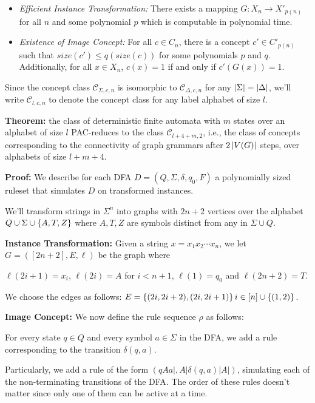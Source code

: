 \documentclass[]{article}
\providecommand{\tightlist}{%
  \setlength{\itemsep}{0pt}\setlength{\parskip}{0pt}}
\def\Concepts{\mathcal{C}\xspace}
\begin{document}
\begin{itemize}
\tightlist
\item
  \emph{Efficient Instance Transformation:} There exists a mapping
  \(G: X_n \to X'_{p(n)}\) for all \(n\) and some polynomial \(p\) which
  is computable in polynomial time.
\item
  \emph{Existence of Image Concept:} For all \(c \in C_n\), there is a
  concept \(c' \in C'_{p(n)}\) such that \(size(c') \leq q(size(c))\)
  for some polynomials \(p\) and \(q\). Additionally, for all
  \(x \in X_n\), \(c(x) = 1\) if and only if \(c'(G(x)) = 1\).
\end{itemize}

Since the concept class $\Concepts_{\Sigma,c,n}$ is isomorphic to $\Concepts_{\Delta,c,n}$ for any $\left| \Sigma \right| = \left| \Delta \right|$, we'll write $\Concepts_{l,c,n}$ to denote the concept class for any label alphabet of size $l$. 

\textbf{Theorem:} the class of deterministic finite automata with $m$ states
over an alphabet of size $l$ PAC-reduces to the class $\Concepts_{l+4+m,2}$,
i.e., the class of concepts corresponding to the connectivity of graph grammars
after $2\left| V(G) \right|$ steps, over alphabets of size $l+m+4$.

\textbf{Proof:}
We describe for each DFA $D=(Q,\Sigma,\delta,q_0,F)$ a polynomially sized ruleset that
simulates \(D\) on transformed instances.

We'll transform strings in $\Sigma^n$ into graphs with $2n+2$ vertices over the alphabet $Q\cup\Sigma\cup \left\{ A,T,Z \right\}$ where $A,T,Z$ are symbols distinct from any in $\Sigma\cup Q$.

\textbf{Instance Transformation:} 
Given a string $x = x_1x_2\dotsm x_n$, we let $G = ([2n+2],E,\ell)$ be the graph where

$\ell(2i+1) = x_i$, $\ell(2i) = A$ for $i < n+1$, $\ell(1) = q_0$ and $\ell(2n+2) = T$.

We choose the edges as follows: $E = \left\{ (2i,2i+2),(2i,2i+1) \right\}{i\in [n]} \cup \left\{ (1,2) \right\}$.

\textbf{Image Concept:}
We now define the rule sequence $\rho$ as follows:

For every state $q\in Q$ and every symbol $a\in \Sigma$ in the DFA, we add a rule corresponding to the transition $\delta(q,a)$.

Particularly, we add a rule of the form $(qAa|, A|\delta(q,a)|A|)$, simulating
each of the non-terminating transitions of the DFA. The order of
these rules doesn't matter since only one of them can be active at a time.
\end{document}
